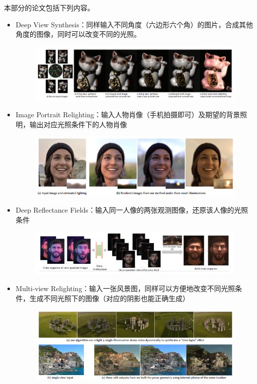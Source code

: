 \documentclass[logo,reportComp]{thesis}
\begin{document}
本部分的论文包括下列内容。
\begin{itemize}
	\item Deep View Synthesis\cite{xu:deep_view}：同样输入不同角度（六边形六个角）的图片，合成其他角度的图像，同时可以改变不同的光照。
\begin{figure}[H]
\centering
\includegraphics[width=0.8\linewidth]{view-synthesis.png}
\end{figure}
	\item Image Portrait Relighting\cite{sun:image_protrait}：输入人物肖像（手机拍摄即可）及期望的背景照明，输出对应光照条件下的人物肖像
\begin{figure}[H]
\centering
\includegraphics[width=0.8\linewidth]{image-portrait-relighting.png}
\end{figure}
	\item Deep Reflectance Fields\cite{meka:deep_reflectance}：输入同一人像的两张观测图像，还原该人像的光照条件
\begin{figure}[H]
\centering
\includegraphics[width=0.8\linewidth]{deep-reflectance.png}
\end{figure}
	\item Multi-view Relighting\cite{philip:multi_view}：输入一张风景图，同样可以方便地改变不同光照条件，生成不同光照下的图像（对应的阴影也能正确生成）
\begin{figure}[H]
\centering
\includegraphics[width=0.8\linewidth]{multi-view-relighting.png}
\end{figure}
\end{itemize}
\end{document}
